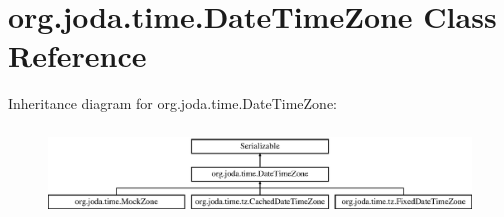 \hypertarget{classorg_1_1joda_1_1time_1_1_date_time_zone}{\section{org.\-joda.\-time.\-Date\-Time\-Zone Class Reference}
\label{classorg_1_1joda_1_1time_1_1_date_time_zone}
}
Inheritance diagram for org.\-joda.\-time.\-Date\-Time\-Zone\-:\begin{figure}[H]
\begin{center}
\leavevmode
\includegraphics[height=2.372881cm]{classorg_1_1joda_1_1time_1_1_date_time_zone}
\end{center}
\end{figure}

